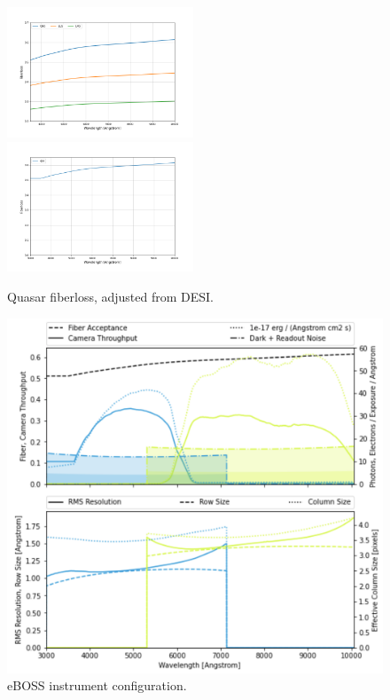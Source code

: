 \begin{figure}[h]
    \centering
    \includegraphics[width=0.495\textwidth]{images/specsim/desimodel-fiberloss.png}
    \includegraphics[width=0.495\textwidth]{images/specsim/fiberloss_qso.png}
    \caption{Quasar fiberloss, adjusted from DESI.}
    \label{fig:qso_fiberloss}
\end{figure}

\begin{figure}[h]
\centering
\includegraphics[width=12cm]{images/specsim/eboss_config.png}
\caption{eBOSS instrument configuration.}
\label{fig:eboss_config}
\end{figure}

